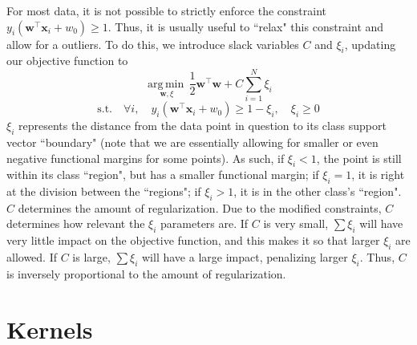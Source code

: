 \documentclass[12pt]{article}
\newcommand{\argmin}[1]{\underset{#1}{\operatorname{arg\,min\,}}}
\begin{document}
For most data, it is not possible to strictly enforce the constraint $y_i(\mathbf{w}^\top\mathbf{x}_i + w_0) \geq 1$. Thus, it is usually useful to ``relax" this constraint and allow for a outliers. To do this, we introduce slack variables $C$ and $\xi_i$, updating our objective function to
\[ \argmin{\mathbf{w},\xi}\frac{1}{2}\mathbf{w}^\top\mathbf{w} + C\sum_{i=1}^{N}\xi_i \]
\[ \text{s.t.} \quad \forall i, \quad y_i(\mathbf{w}^\top\mathbf{x}_i + w_0) \geq 1 - \xi_i, \quad \xi_i \geq 0 \]
$\xi_i$ represents the distance from the data point in question to its class support vector ``boundary" (note that we are essentially allowing for smaller or even negative functional margins for some points). As such, if $\xi_i < 1$, the point is still within its class ``region", but has a smaller functional margin; if $\xi_i = 1$, it is right at the division between the ``regions"; if $\xi_i > 1$, it is in the other class's ``region".
\\\newline
$C$ determines the amount of regularization. Due to the modified constraints, $C$ determines how relevant the $\xi_i$ parameters are. If $C$ is very small, $\sum\xi_i$ will have very little impact on the objective function, and this makes it so that larger $\xi_i$ are allowed. If $C$ is large, $\sum\xi_i$ will have a large impact, penalizing larger $\xi_i$. Thus, $C$ is inversely proportional to the amount of regularization.

\section{Kernels}
\end{document}
